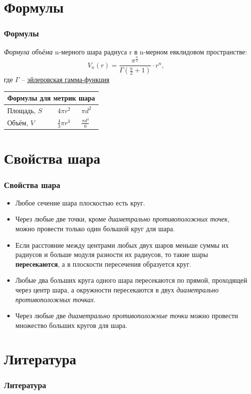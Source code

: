 \documentclass[xcolor=table, t]{beamer}
\begin{document}
\section{Формулы}
\begin{frame}
    \frametitle<presentation>{Формулы}
    \textit{Формула объёма} n-мерного шара радиуса r в n-мерном евклидовом пространстве:
    $$ V_n(r)=\frac{\pi^\frac{n}{2}}{\Gamma(\frac{n}{2} + 1)}\cdot r^n, $$
    где $ \Gamma $ -- \href{https://univerlib.com/mathematical_analysis/parameter_integrals/euler_integrals/}{эйлеровская гамма-функция} \cite{olver2016nist}
    \newline
    \begin{flushleft}
    \begin{tabular}{ |p{3cm}|p{2cm}|p{2cm}|  }
        \hline
        \multicolumn{3}{|c|}{\textcolor{agentP}{Формулы для метрик шара}}\\
        \hline
        \textcolor{agentP}{Площадь, $ S $} & \textcolor{agentP}{$ 4\pi r^2 $} & \textcolor{agentP}{$ \pi d^2 $}\\[2ex]
        \hline
        \textcolor{agentP}{Объём, $ V $} & \textcolor{agentP}{$ \frac{4}{3} \pi r^3 $} & \textcolor{agentP}{$ \frac{\pi d^3}{6} $}\\[2ex]
        \hline
    \end{tabular}
    \end{flushleft}
    \href{https://onlinetestpad.com/ru/testview/696278-sfera-shar-ploshhad-sfery}{}
\end{frame}

\section{Свойства шара}
\begin{frame}
    \frametitle<presentation>{Свойства шара}
    \begin{itemize}
        \item<1-> Любое сечение шара плоскостью есть круг.
        \item<3-> Через любые две точки, кроме \textit{диаметрально противоположных точек}, можно провести только один большой круг для шара.
        \item<5-> Если расстояние между центрами любых двух шаров меньше суммы их радиусов и больше модуля разности их радиусов, то такие шары \textbf{пересекаются}, а в плоскости пересечения образуется круг.
        \item<4-> Любые два больших круга одного шара пересекаются по прямой, проходящей через центр шара, а окружности пересекаются в двух \textit{диаметрально противоположных точках}.
        \item<2-> Через любые две \textit{диаметрально противоположные точки} можно провести множество больших кругов для шара.
    \end{itemize}
\end{frame}

\section{Литература}
\begin{frame}
        \frametitle<presentation>{Литература}
        
        
\end{frame}
\end{document}
